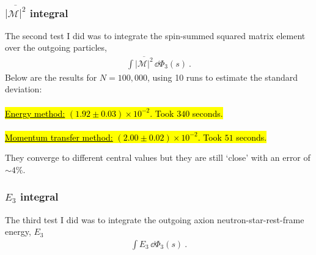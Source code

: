 \subsubsection*{$\overline{|\mathcal{M}|^2}$ integral}
The second test I did was to integrate the spin-summed squared matrix element over the outgoing particles,
\begin{align}
    \int \overline{|\mathcal{M}|^2} \, \dd \Phi_3 (s) \ .
\end{align}
Below are the results for $N = 100,000$, using 10 runs to estimate the standard deviation:\\\\
\hl{{\underline{Energy method:}}
$(1.92 \pm 0.03) \times 10^{-2}$.
Took $340$ seconds.}\\\\
\hl{{\underline{Momentum transfer method:}}
$(2.00 \pm 0.02) \times 10^{-2}$. 
Took $51$ seconds.}

They converge to different central values but they are still `close' with an error of $\sim 4\%$. 

\subsubsection*{$E_3$ integral}
The third test I did was to integrate the outgoing axion neutron-star-rest-frame energy, $E_3$
\begin{align}
    \int E_3 \, \dd \Phi_3 (s) \ .
\end{align}
